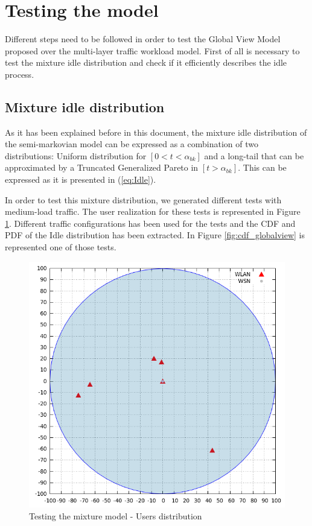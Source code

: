 \section{Testing the model}
Different steps need to be followed in order to test the Global View Model proposed over the multi-layer traffic workload model. First of all is necessary to test the mixture idle distribution and check if it efficiently describes the idle process. 


\subsection{Mixture idle distribution}
As it has been explained before in this document, the mixture idle distribution of the semi-markovian model can be expressed as a combination of two distributions: Uniform distribution for $[0 < t < \alpha_{bk}]$ and a long-tail that can be approximated by a Truncated Generalized Pareto in $[t > \alpha_{bk}]$. This can be expressed as it is presented in (\ref{eq:Idle}).

In order to test this mixture distribution, we generated different tests with medium-load traffic. The user realization for these tests is represented in Figure \ref{fig:test_model_network}. Different traffic configurations has been used for the tests and the \acs{CDF} and PDF of the Idle distribution has been extracted. In Figure \ref{fig:cdf_globalview} is represented one of those tests.


\begin{figure}
	\centering
	\includegraphics[scale=0.35]{images/results/GlobalView/test_model_network}
	\caption{Testing the mixture model - Users distribution}
	\label{fig:test_model_network}
\end{figure}


